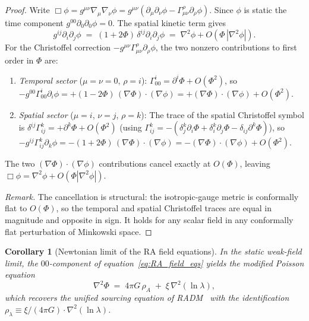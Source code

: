 \documentclass[11pt,a4paper]{article}
\theoremstyle{plain}
\newtheorem{corollary}[theorem]{Corollary}
\theoremstyle{definition}
\theoremstyle{remark}
\begin{document}
\begin{description}
\begin{proof}
Write $\Box\phi = g^{\mu\nu}\nabla_\mu\nabla_\nu\phi
= g^{\mu\nu}(\partial_\mu\partial_\nu\phi - \Gamma^\rho_{\mu\nu}\partial_\rho\phi)$.
Since $\phi$ is static the time component $g^{00}\partial_0\partial_0\phi = 0$.
The spatial kinetic term gives
\[
  g^{ij}\partial_i\partial_j\phi \;=\; (1+2\Phi)\,\delta^{ij}\partial_i\partial_j\phi
  \;=\; \nabla^2\phi + O(\Phi\,|\nabla^2\phi|).
\]
For the Christoffel correction $-g^{\mu\nu}\Gamma^\rho_{\mu\nu}\partial_\rho\phi$,
the two nonzero contributions to first order in $\Phi$ are:
\begin{enumerate}[noitemsep]
  \item \emph{Temporal sector} ($\mu=\nu=0$, $\rho=i$):
  $\Gamma^i_{00} = \partial^i\Phi + O(\Phi^2)$, so
  $-g^{00}\Gamma^i_{00}\partial_i\phi = +(1-2\Phi)\,(\nabla\Phi)\cdot(\nabla\phi)
  = +(\nabla\Phi)\cdot(\nabla\phi) + O(\Phi^2)$.
  \item \emph{Spatial sector} ($\mu=i$, $\nu=j$, $\rho=k$):
  The trace of the spatial Christoffel symbol is
  $\delta^{ij}\Gamma^k_{ij} = +\partial^k\Phi + O(\Phi^2)$
  (using $\Gamma^k_{ij} = -({\delta^k_j\partial_i\Phi + \delta^k_i\partial_j\Phi
  - \delta_{ij}\partial^k\Phi})$), so
  $-g^{ij}\Gamma^k_{ij}\partial_k\phi = -(1+2\Phi)\,(\nabla\Phi)\cdot(\nabla\phi)
  = -(\nabla\Phi)\cdot(\nabla\phi) + O(\Phi^2)$.
\end{enumerate}
The two $(\nabla\Phi)\cdot(\nabla\phi)$ contributions cancel exactly at $O(\Phi)$,
leaving $\Box\phi = \nabla^2\phi + O(\Phi|\nabla^2\phi|)$.

\smallskip\noindent
\emph{Remark.} The cancellation is structural: the isotropic-gauge metric is
conformally flat to $O(\Phi)$, so the temporal and spatial Christoffel traces
are equal in magnitude and opposite in sign. It holds for any scalar field
in any conformally flat perturbation of Minkowski space.
\end{proof}

\begin{corollary}[Newtonian limit of the RA field equations]
\label{cor:poisson_ra}
In the static weak-field limit, the $00$-component of
equation~\eqref{eq:RA_field_eqs} yields the modified Poisson equation
\begin{equation}
  \nabla^2\Phi \;=\; 4\pi G\,\rho_A \;+\; \xi\,\nabla^2(\ln\lambda),
  \label{eq:modified_poisson}
\end{equation}
which recovers the unified sourcing equation of
RADM~\citep{Sandeman2026RADM} with the identification
$\rho_\lambda \equiv \xi/(4\pi G)\cdot\nabla^2(\ln\lambda)$.
\end{corollary}


\end{description}
\end{document}
